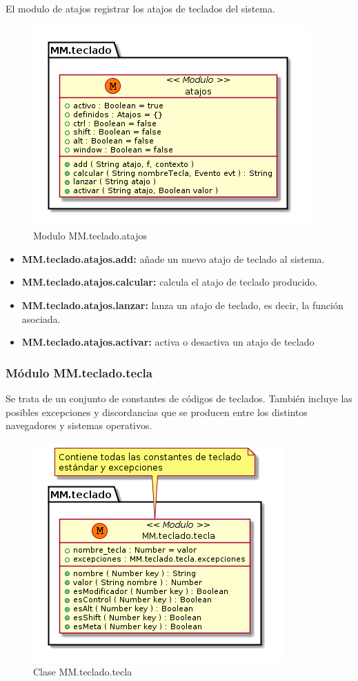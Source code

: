El modulo de atajos registrar los atajos de teclados del sistema.


\begin{figure}[tbph]
\centering
\includegraphics[width=0.6\linewidth]{imagenes/diagrama-clase-mm-teclado-atajos}
\caption{Modulo MM.teclado.atajos}
\label{fig:diagrama-clase-mm-teclado-atajos}
\end{figure}

\begin{itemize}
\item \textbf{MM.teclado.atajos.add:} añade un nuevo atajo de teclado al sistema.
\item \textbf{MM.teclado.atajos.calcular:} calcula el atajo de teclado producido.
\item \textbf{MM.teclado.atajos.lanzar:} lanza un atajo de teclado, es decir, la función asociada. 
\item \textbf{MM.teclado.atajos.activar:} activa o desactiva un atajo de teclado 
\end{itemize}

\subsubsection{Módulo MM.teclado.tecla}
Se trata de un conjunto de constantes de códigos de teclados. También incluye las posibles
excepciones y discordancias que se producen entre los distintos navegadores y sistemas operativos.

\begin{figure}[tbph]
\centering
\includegraphics[width=0.4\linewidth]{imagenes/diagrama-clase-mm-teclado-tecla}
\caption{Clase MM.teclado.tecla}
\label{fig:diagrama-clase-mm-teclado-tecla}
\end{figure}


